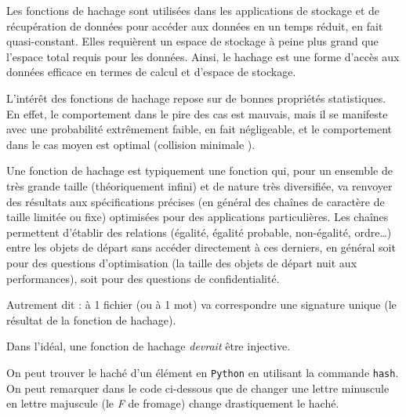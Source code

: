 \documentclass[
  letterpaper,
]{scrbook}
\theoremstyle{plain}
\theoremstyle{definition}
\theoremstyle{definition}
\theoremstyle{remark}
\begin{document}
Les fonctions de hachage sont utilisées dans les applications de
stockage et de récupération de données pour accéder aux données en un
temps réduit, en fait quasi-constant. Elles requièrent un espace de
stockage à peine plus grand que l'espace total requis pour les données.
Ainsi, le hachage est une forme d'accès aux données efficace en termes
de calcul et d'espace de stockage.

L'intérêt des fonctions de hachage repose sur de bonnes propriétés
statistiques. En effet, le comportement dans le pire des cas est
mauvais, mais il se manifeste avec une probabilité extrêmement faible,
en fait négligeable, et le comportement dans le cas moyen est optimal
(collision minimale ).

Une fonction de hachage est typiquement une fonction qui, pour un
ensemble de très grande taille (théoriquement infini) et de nature très
diversifiée, va renvoyer des résultats aux spécifications précises (en
général des chaînes de caractère de taille limitée ou fixe) optimisées
pour des applications particulières. Les chaînes permettent d'établir
des relations (égalité, égalité probable, non-égalité, ordre\ldots)
entre les objets de départ sans accéder directement à ces derniers, en
général soit pour des questions d'optimisation (la taille des objets de
départ nuit aux performances), soit pour des questions de
confidentialité.

Autrement dit : à 1 fichier (ou à 1 mot) va correspondre une signature
unique (le résultat de la fonction de hachage).

\begin{tcolorbox}[enhanced jigsaw, opacityback=0, rightrule=.15mm, breakable, toprule=.15mm, colbacktitle=quarto-callout-important-color!10!white, title=\textcolor{quarto-callout-important-color}{\faExclamation}\hspace{0.5em}{Important}, titlerule=0mm, arc=.35mm, colback=white, coltitle=black, colframe=quarto-callout-important-color-frame, bottomtitle=1mm, toptitle=1mm, bottomrule=.15mm, leftrule=.75mm, left=2mm, opacitybacktitle=0.6]

Dans l'idéal, une fonction de hachage \emph{devrait} être injective.

\end{tcolorbox}

On peut trouver le haché d'un élément en \texttt{Python} en utilisant la
commande \texttt{hash}. On peut remarquer dans le code ci-dessous que de
changer une lettre minuscule en lettre majuscule (le \emph{F} de
fromage) change drastiquement le haché.
\end{document}
